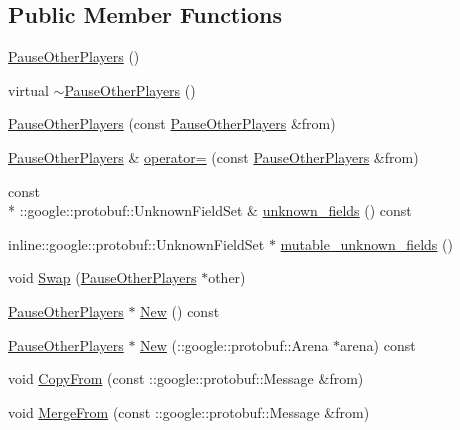\subsection*{Public Member Functions}
\begin{DoxyCompactItemize}
\item 
\hyperlink{class_pause_other_players_a0712df06b1ecd8663b3cdaf25ed83afa}{Pause\-Other\-Players} ()
\item 
virtual \hyperlink{class_pause_other_players_a9becaa73e48de9ed2f3086e8f89b9f23}{$\sim$\-Pause\-Other\-Players} ()
\item 
\hyperlink{class_pause_other_players_a27bbeda44b6b6e905276c0a6a5f38702}{Pause\-Other\-Players} (const \hyperlink{class_pause_other_players}{Pause\-Other\-Players} \&from)
\item 
\hyperlink{class_pause_other_players}{Pause\-Other\-Players} \& \hyperlink{class_pause_other_players_aa77bc93b6bccd761f4360c56b784e1aa}{operator=} (const \hyperlink{class_pause_other_players}{Pause\-Other\-Players} \&from)
\item 
const \\*
\-::google\-::protobuf\-::\-Unknown\-Field\-Set \& \hyperlink{class_pause_other_players_a4b909a26d8345e6efbaac4a18d97cc27}{unknown\-\_\-fields} () const 
\item 
inline\-::google\-::protobuf\-::\-Unknown\-Field\-Set $\ast$ \hyperlink{class_pause_other_players_a1736e5ae730a67ca4d70a7a7fb252f09}{mutable\-\_\-unknown\-\_\-fields} ()
\item 
void \hyperlink{class_pause_other_players_a197ba9c7116c63439e83c9365ceb57e0}{Swap} (\hyperlink{class_pause_other_players}{Pause\-Other\-Players} $\ast$other)
\item 
\hyperlink{class_pause_other_players}{Pause\-Other\-Players} $\ast$ \hyperlink{class_pause_other_players_a7732cb5a8cfb74cd10d5ef5003860ee8}{New} () const 
\item 
\hyperlink{class_pause_other_players}{Pause\-Other\-Players} $\ast$ \hyperlink{class_pause_other_players_a35ff08f92a7f3996646b99ea055ca8dc}{New} (\-::google\-::protobuf\-::\-Arena $\ast$arena) const 
\item 
void \hyperlink{class_pause_other_players_adb110b8a4f8a0213d25e732180c49d42}{Copy\-From} (const \-::google\-::protobuf\-::\-Message \&from)
\item 
void \hyperlink{class_pause_other_players_ab72874774c57843b378e3c11ef49b15c}{Merge\-From} (const \-::google\-::protobuf\-::\-Message \&from)
\item 

\end{DoxyCompactItemize}
